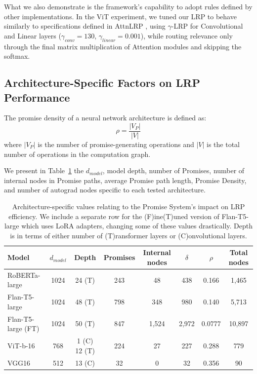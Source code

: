 \documentclass{article}
\begin{document}
What we also demonstrate is the framework's capability to adopt rules defined by other implementations. In the ViT experiment, we tuned our LRP to behave similarly to specifications defined in AttnLRP \cite{achtibat2024attnlrp},
using $\gamma$-LRP for Convolutional and Linear layers ($\gamma_{conv} = 130$, $\gamma_{linear} = 0.001$), while routing relevance only through the final matrix multiplication of Attention modules and skipping the softmax.

\subsection{Architecture-Specific Factors on LRP Performance}

\begin{definition}
The promise density of a neural network architecture is defined as:
$$\rho = \frac{|V_P|}{|V|}$$
where $|V_P|$ is the number of promise-generating operations and $|V|$ is the total number of operations in the computation graph.
\end{definition}

We present in Table~\ref{architecture-promises-table} the $d_{model}$, model depth, number of Promises, number of internal nodes in Promise paths, average Promise path
length, Promise Density, and number of autograd nodes specific to each tested architecture.

\begin{table}[!h]
\begin{center}
  \caption{Architecture-specific values relating to the Promise System's impact on LRP efficiency. We include a separate row for the
  (F)ine(T)uned version of Flan-T5-large which uses LoRA adapters, changing some of these values drastically.
  Depth is in terms of either number of (T)ransformer layers or (C)onvolutional layers.}
  \label{architecture-promises-table}
  \begin{tabular}{ lccccccc  }
    \toprule
    \textbf{Model} & \textbf{$d_{model}$} & \textbf{Depth} & \textbf{Promises} & \textbf{Internal nodes} & \textbf{$\delta$} & \textbf{$\rho$} & \textbf{Total nodes} \\
    \midrule
    RoBERTa-large & 1024 & 24 (T) & 243 & 48 & 438 & 0.166 & 1,465 \\ 
    Flan-T5-large & 1024 & 48 (T) & 798 & 348 & 980 & 0.140 & 5,713 \\ 
    Flan-T5-large (FT) & 1024 & 50 (T) & 847 & 1,524 & 2,972 & 0.0777 & 10,897 \\ 
    ViT-b-16 & 768 & 1 (C) 12 (T) & 224 & 27 & 227 & 0.288 & 779 \\ 
    VGG16 & 512 & 13 (C) & 32 & 0 & 32 & 0.356 & 90 \\ 
    \bottomrule
  \end{tabular}
\end{center}
\end{table}
\end{document}
